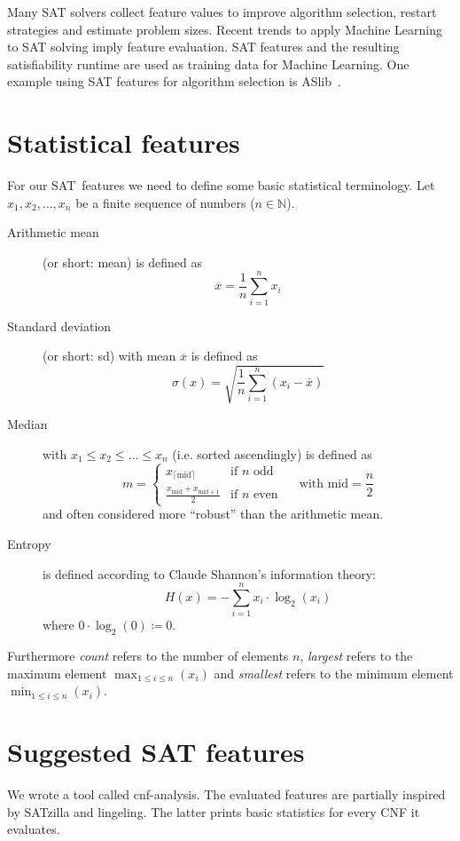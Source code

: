 Many SAT solvers collect feature values to improve algorithm selection,
restart strategies and estimate problem sizes. Recent trends to apply Machine
Learning to SAT solving imply feature evaluation. SAT features and the resulting
satisfiability runtime are used as training data for Machine Learning. One example
using SAT features for algorithm selection is ASlib~\cite{aslib}.

\section{Statistical features}
\label{sec:features-stats}
%
For our SAT~features we need to define some basic statistical terminology.
Let $x_1, x_2, \ldots, x_n$ be a finite sequence of numbers ($n \in \mathbb N$).
\begin{description}
  \item[Arithmetic mean] (or short: mean)
    is defined as
    \[ \overline{x} = \frac1n \sum_{i=1}^n x_i \]
  \item[Standard deviation] (or short: sd)
    with mean $\overline{x}$ is defined as
    \[ \sigma(x) = \sqrt{\frac1n \sum_{i=1}^n (x_i - \overline{x})} \]
  \item[Median]
    with $x_1 \leq x_2 \leq \ldots \leq x_n$
    (i.e. sorted ascendingly) is defined as
    \[
       m = \begin{cases}
         x_{\lceil \text{mid}\rceil} & \text{if } n \text{ odd} \\
         \frac{x_{\text{mid}} + x_{\text{mid} + 1}}{2} & \text{if } n \text{ even}
       \end{cases}
       \quad\text{ with } \text{mid} = \frac{n}{2}
    \]
    and often considered more \enquote{robust} than the arithmetic mean.
  \item[Entropy]
    is defined according to Claude Shannon's information theory:
    \[ H(x) = -\sum_{i=1}^n x_i \cdot \log_2(x_i) \]
    where $0 \cdot \log_2(0) \coloneqq 0$.
\end{description}

Furthermore \emph{count} refers to the number of elements $n$,
\emph{largest} refers to the maximum element $\max_{1 \leq i \leq n}(x_i)$
and \emph{smallest} refers to the minimum element $\min_{1 \leq i \leq n}(x_i)$.

\section{Suggested SAT features}
\label{sec:features-suggested}
%
We wrote a tool called cnf-analysis. The evaluated features are partially inspired
by SATzilla and lingeling. The latter prints basic statistics for every CNF it
evaluates.

